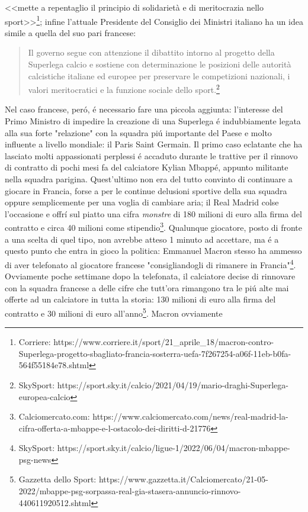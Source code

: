 \documentclass[
    corpo=12pt,
    oneside,
    evenboxes,
    tipotesi=triennale,
    stile=classica,
    oldstyle,
    autoretitolo,
    greek,
]{toptesi}
\begin{document}
\begin{interlinea}{1.5}
<<mette a repentaglio il principio di solidarietà e di meritocrazia nello sport>>\footnote{Corriere: https://www.corriere.it/sport/21\_aprile\_18/macron-contro-Superlega-progetto-sbagliato-francia-sosterra-uefa-7f267254-a06f-11eb-b0fa-564f55184e78.shtml};
infine l'attuale Presidente del Consiglio dei Ministri italiano ha un idea simile a quella del suo pari francese: \begin{quote}
    \small Il governo segue con attenzione il dibattito intorno al progetto della Superlega calcio e sostiene con determinazione le posizioni delle autorità calcistiche italiane ed europee per preservare le competizioni nazionali, i valori meritocratici e la funzione sociale dello sport.\footnote{SkySport: https://sport.sky.it/calcio/2021/04/19/mario-draghi-Superlega-europea-calcio}
\end{quote} 
Nel caso francese, per\'o, \'e necessario fare una piccola aggiunta: l'interesse del Primo Ministro di impedire la creazione di una Superlega
\'e indubbiamente legata alla sua forte "relazione" con la squadra pi\'u importante del Paese e molto influente a livello mondiale: il Paris Saint Germain.
Il primo caso eclatante che ha lasciato molti appassionati perplessi \'e accaduto durante le trattive per il rinnovo di contratto di pochi mesi fa del calciatore
Kylian Mbapp\'e, appunto militante nella squadra parigina. Quest'ultimo non era del tutto convinto di continuare a giocare in Francia, forse 
a per le continue delusioni sportive della sua squadra oppure semplicemente per una voglia di cambiare aria; il Real Madrid colse l'occasione e offr\'i
sul piatto una cifra \emph{monstre} di 180 milioni di euro alla firma del contratto e circa 40 milioni come stipendio\footnote{Calciomercato.com: https://www.calciomercato.com/news/real-madrid-la-cifra-offerta-a-mbappe-e-l-ostacolo-dei-diritti-d-21776}.
Qualunque giocatore, posto di fronte a una scelta di quel tipo, non avrebbe atteso 1 minuto ad accettare, ma \'e a questo punto che entra in gioco la politica: Emmanuel Macron 
stesso ha ammesso di aver telefonato al giocatore francese "consigliandogli di rimanere in Francia"\footnote{SkySport: https://sport.sky.it/calcio/ligue-1/2022/06/04/macron-mbappe-psg-news}.
Ovviamente poche settimane dopo la telefonata, il calciatore decise di rinnovare con la squadra francese a delle cifre che tutt'ora rimangono tra le pi\'u alte mai
offerte ad un calciatore in tutta la storia: 130 milioni di euro alla firma del contratto e 30 milioni di euro all'anno\footnote{Gazzetta dello Sport: https://www.gazzetta.it/Calciomercato/21-05-2022/mbappe-psg-sorpassa-real-gia-stasera-annuncio-rinnovo-440611920512.shtml}. Macron ovviamente 

\end{interlinea}
\end{document}
